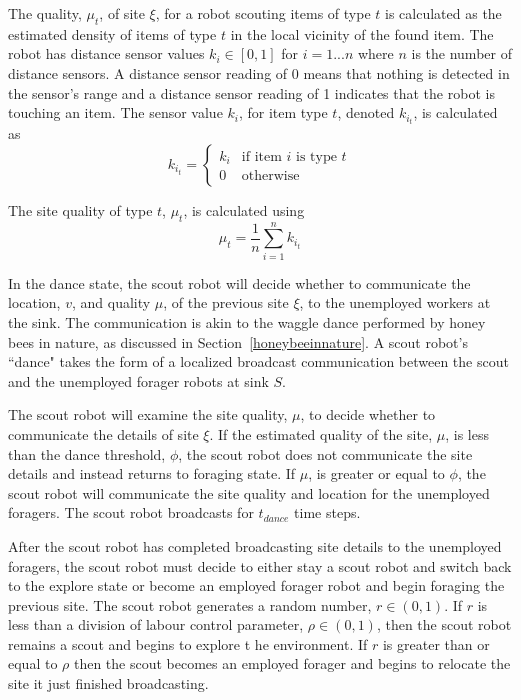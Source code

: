 The quality, $\mu_t$, of site $\xi$, for a robot scouting items of type $t$ is calculated as the estimated density of items of type $t$ in the local vicinity of the found item. The robot has distance sensor values $k_i\in[0,1]$ for $ i = 1...n$ where $n$ is the number of distance sensors. A distance sensor reading of 0 means that nothing is detected in the sensor's range and a distance sensor reading of 1 indicates that the robot is touching an item. The sensor value $k_i$, for item type $t$, denoted $k_{i_t}$, is calculated as 
\begin{equation}
\label{densitytype}
k_{i_t}=
    \begin{cases}
      k_i & \text{if item $i$ is type $t$} \\
      0 & \text{otherwise}
    \end{cases}
\end{equation}

The site quality of type $t$, $\mu_t$, is calculated using
\begin{equation}
\label{density}
\mu_t = \frac{1}{n}\sum\limits_{i=1}^n k_{i_t}
\end{equation}

In the dance state, the scout robot will decide whether to communicate the location, $v$, and quality $\mu$, of the previous site $\xi$, to the unemployed workers at the sink. The communication is akin to the waggle dance performed by honey bees in nature, as discussed in Section~\ref{honeybeeinnature}. A scout robot's ``dance" takes the form of a localized broadcast communication between the scout and the unemployed forager robots at sink $S$.

The scout robot will examine the site quality, $\mu$, to decide whether to communicate the details of site $\xi$. If the estimated quality of the site, $\mu$, is less than the dance threshold, $\phi$, the scout robot does not communicate the site details and instead returns to foraging state. If $\mu$, is greater or equal to $\phi$, the scout robot will communicate the site quality and location for the unemployed foragers. The scout robot broadcasts for $t_{dance}$ time steps.

After the scout robot has completed broadcasting site details to the unemployed foragers, the scout robot must decide to either stay a scout robot and switch back to the explore state or become an employed forager robot and begin foraging the previous site. The scout robot generates a random number, $r\in(0,1)$. If $r$ is less than a division of labour control parameter, $\rho\in(0,1)$, then the scout robot remains a scout and begins to explore t he environment. If $r$ is greater than or equal to $\rho$ then the scout becomes an employed forager and begins to relocate the site it just finished broadcasting.

